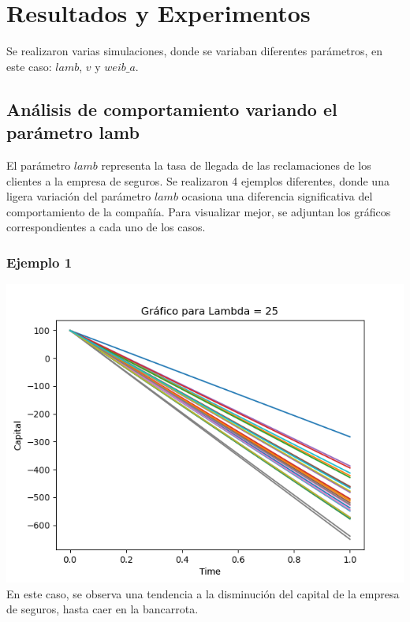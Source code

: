 \documentclass{article}
\begin{document}
 \section{Resultados y Experimentos}
 Se realizaron varias simulaciones, donde se variaban diferentes parámetros, en este caso: $lamb$, $v$ y $weib\_a$.

 \subsection{Análisis de comportamiento variando el parámetro lamb}
 El parámetro $lamb$ representa la tasa de llegada de las reclamaciones de los clientes a la empresa de seguros. Se realizaron 4 ejemplos diferentes, donde una ligera variación del parámetro $lamb$ ocasiona una diferencia significativa del comportamiento de la compañía. 
 Para visualizar mejor, se adjuntan los gráficos correspondientes a cada uno de los casos.

 \subsubsection{Ejemplo 1}
 \includegraphics[scale = 0.8]{lamb1.png}
 En este caso, se observa una tendencia a la disminución del capital de la empresa de seguros, hasta caer en la bancarrota.\\
\end{document}
